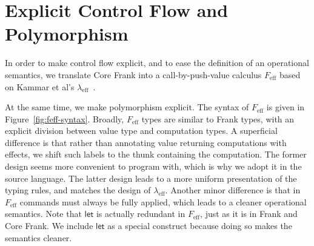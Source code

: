 \documentclass[preprint]{sigplanconf}
\newcommand{\lameff}{$\lambda_\mathrm{eff}$\xspace}
\newcommand{\feff}{$F_\textrm{eff}$\xspace}
\newcommand{\key}[1]{\mathsf{#1}}
\begin{document}
\section{Explicit Control Flow and Polymorphism}
\label{sec:feff}

In order to make control flow explicit, and to ease the definition of
an operational semantics, we translate Core Frank into a
call-by-push-value calculus \feff based on Kammar et al's
\lameff~\cite{KammarLO13}.

At the same time, we make polymorphism explicit. The syntax of \feff
is given in Figure~\ref{fig:feff-syntax}. Broadly, \feff types are
similar to Frank types, with an explicit division between value type
and computation types. A superficial difference is that rather than
annotating value returning computations with effects, we shift such
labels to the thunk containing the computation. The former design
seems more convenient to program with, which is why we adopt it in the
source language. The latter design leads to a more uniform
presentation of the typing rules, and matches the design of
\lameff. Another minor difference is that in \feff commands must
always be fully applied, which leads to a cleaner operational
semantics.
%
Note that $\key{let}$ is actually redundant in \feff, just as it is in
Frank and Core Frank. We include $\key{let}$ as a special construct
because doing so makes the semantics cleaner.
%
\end{document}

